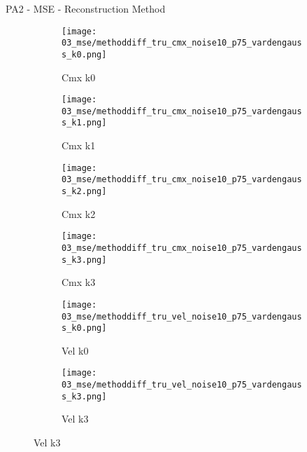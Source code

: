 \documentclass{beamer}
\begin{document}
\begin{frame}{PA2 - MSE - Reconstruction Method}{}
\begin{figure}
\begin{subfigure}{0.24\textwidth}
\texttt{[image: 03\_mse/methoddiff\_tru\_cmx\_noise10\_p75\_vardengauss\_k0.png]}
\vspace{-20pt}
\caption*{\tiny Cmx k0}
\end{subfigure}
\begin{subfigure}{0.24\textwidth}
\texttt{[image: 03\_mse/methoddiff\_tru\_cmx\_noise10\_p75\_vardengauss\_k1.png]}
\vspace{-20pt}
\caption*{\tiny Cmx k1}
\end{subfigure}
\begin{subfigure}{0.24\textwidth}
\texttt{[image: 03\_mse/methoddiff\_tru\_cmx\_noise10\_p75\_vardengauss\_k2.png]}
\vspace{-20pt}
\caption*{\tiny Cmx k2}
\end{subfigure}
\begin{subfigure}{0.24\textwidth}
\texttt{[image: 03\_mse/methoddiff\_tru\_cmx\_noise10\_p75\_vardengauss\_k3.png]}
\vspace{-20pt}
\caption*{\tiny Cmx k3}
\end{subfigure}

\begin{subfigure}{0.49\textwidth}
\texttt{[image: 03\_mse/methoddiff\_tru\_vel\_noise10\_p75\_vardengauss\_k0.png]}
\vspace{-20pt}
\caption*{\tiny Vel k0}
\end{subfigure}
\begin{subfigure}{0.49\textwidth}
\texttt{[image: 03\_mse/methoddiff\_tru\_vel\_noise10\_p75\_vardengauss\_k3.png]}
\vspace{-20pt}
\caption*{\tiny Vel k3}
\end{subfigure}
\end{figure}
\end{frame}
\end{document}
